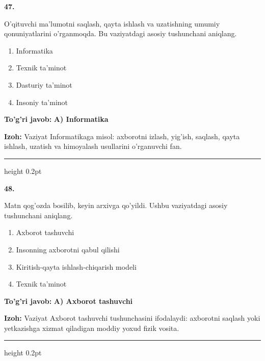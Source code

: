 \documentclass[10pt,a4paper,oneside]{article}
\begin{document}
\noindent\textbf{\color{ink}47.}
\par
O'qituvchi ma'lumotni saqlash, qayta ishlash va uzatishning umumiy qonuniyatlarini o'rganmoqda. Bu vaziyatdagi asosiy tushunchani aniqlang.
\begin{enumerate}[label=\Alph*),leftmargin=9mm]
\item Informatika
\item Texnik ta'minot
\item Dasturiy ta'minot
\item Insoniy ta'minot
\end{enumerate}
\begin{tcolorbox}[enhanced,breakable,colback=teal!4,colframe=teal!50!black,boxrule=0.5pt,arc=1.1mm,left=3mm,right=3mm,top=1.7mm,bottom=1.7mm,before skip=2mm,after skip=2mm]
\textbf{\color{teal}To'g'ri javob:} \textbf{A) Informatika}
\par\smallskip
\textbf{Izoh:} Vaziyat Informatikaga misol: axborotni izlash, yig'ish, saqlash, qayta ishlash, uzatish va himoyalash usullarini o'rganuvchi fan.
\end{tcolorbox}
\vspace{2mm}\hrule height 0.2pt \vspace{3mm}

\noindent\textbf{\color{ink}48.}
\par
Matn qog'ozda bosilib, keyin arxivga qo'yildi. Ushbu vaziyatdagi asosiy tushunchani aniqlang.
\begin{enumerate}[label=\Alph*),leftmargin=9mm]
\item Axborot tashuvchi
\item Insonning axborotni qabul qilishi
\item Kiritish-qayta ishlash-chiqarish modeli
\item Texnik ta'minot
\end{enumerate}
\begin{tcolorbox}[enhanced,breakable,colback=teal!4,colframe=teal!50!black,boxrule=0.5pt,arc=1.1mm,left=3mm,right=3mm,top=1.7mm,bottom=1.7mm,before skip=2mm,after skip=2mm]
\textbf{\color{teal}To'g'ri javob:} \textbf{A) Axborot tashuvchi}
\par\smallskip
\textbf{Izoh:} Vaziyat Axborot tashuvchi tushunchasini ifodalaydi: axborotni saqlash yoki yetkazishga xizmat qiladigan moddiy yoxud fizik vosita.
\end{tcolorbox}
\vspace{2mm}\hrule height 0.2pt \vspace{3mm}
\end{document}
